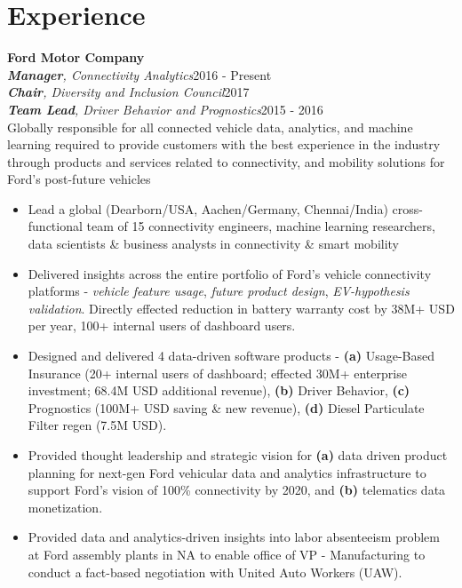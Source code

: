 \documentclass[letterpaper,11pt]{article}
\begin{document}
{\section{Experience}}
\textbf{Ford Motor Company}
      \\
       \emph{\textbf{Manager}, Connectivity Analytics}\hfill {2016 - Present}\\
       \emph{\textbf{Chair}, Diversity and Inclusion Council}\hfill {2017}\\
       \emph{\textbf{Team Lead}, Driver Behavior and Prognostics}\hfill {2015 - 2016}\\[1mm]
       Globally responsible for all connected vehicle data, analytics, and machine learning required to provide customers with the best experience in the industry through products and services related to connectivity, and mobility solutions for Ford's post-future vehicles \\[2mm]
\begin{itemize}[leftmargin=.2in]
 \setlength{\itemsep}{0pt}
 \setlength\itemsep{1mm}
 \item Lead a global (Dearborn/USA, Aachen/Germany, Chennai/India) cross-functional team of 15 connectivity engineers, machine learning researchers, data scientists \& business analysts in connectivity \& smart mobility 
\item Delivered insights across the entire portfolio of Ford's vehicle connectivity platforms - \emph{vehicle feature usage}, \emph{future product design}, \emph{EV-hypothesis validation}. Directly effected reduction in battery warranty cost by 38M+ USD per year, 100+ internal users of dashboard users.
\item Designed and delivered 4 data-driven software products - \textbf{(a)} Usage-Based Insurance (20+ internal users of dashboard; effected 30M+ enterprise investment; 68.4M USD additional revenue), \textbf{(b)} Driver Behavior, \textbf{(c)} Prognostics (100M+ USD saving \& new revenue), \textbf{(d)} Diesel Particulate Filter regen (7.5M USD).
\item Provided thought leadership and strategic vision for \textbf{(a)} data driven product planning for next-gen Ford vehicular data and analytics infrastructure to support Ford's vision of  100\% connectivity by 2020, and \textbf{(b)} telematics data monetization.
\item Provided data and analytics-driven insights into labor absenteeism problem at Ford assembly plants in NA to enable office of VP - Manufacturing to conduct a fact-based negotiation with United Auto Workers (UAW).
 \end{itemize}
\end{document}
